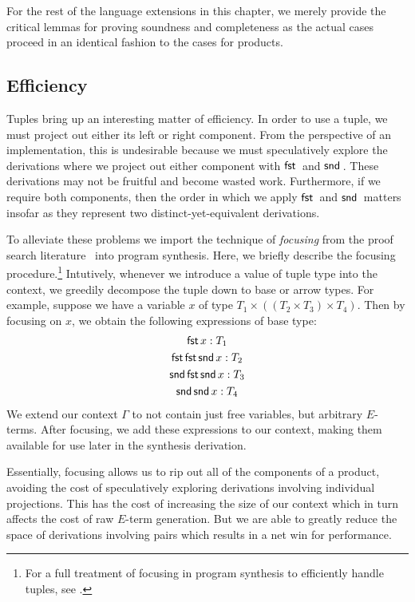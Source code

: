 For the rest of the language extensions in this chapter, we merely provide the critical lemmas for proving soundness and completeness as the actual cases proceed in an identical fashion to the cases for products.

\subsection{Efficiency}
\label{subsec:tuple-efficiency}

Tuples bring up an interesting matter of efficiency.
In order to use a tuple, we must project out either its left or right component.
From the perspective of an implementation, this is undesirable because we must speculatively explore the derivations where we project out either component with $\mfst$ and $\msnd$.
These derivations may not be fruitful and become wasted work.
Furthermore, if we require both components, then the order in which we apply $\mfst$ and $\msnd$ matters insofar as they represent two distinct-yet-equivalent derivations.

To alleviate these problems we import the technique of \emph{focusing} from the proof search literature~\citep{liang-csl-2007} into program synthesis.
Here, we briefly describe the focusing procedure.\footnote{%
  For a full treatment of focusing in program synthesis to efficiently handle tuples, see \citet{frankle-mastersthesis-2015}.
}
Intutively, whenever we introduce a value of tuple type into the context, we greedily decompose the tuple down to base or arrow types.
For example, suppose we have a variable $x$ of type $T_1 × ((T_2 × T_3) × T_4)$.
Then by focusing on $x$, we obtain the following expressions of base type:
\begin{gather*}
  \mathsf{fst}\,x : T_1 \\
  \mathsf{fst}\,\mathsf{fst}\,\mathsf{snd}\,x : T_2 \\
  \mathsf{snd}\,\mathsf{fst}\,\mathsf{snd}\,x : T_3 \\
  \mathsf{snd}\,\mathsf{snd}\,x : T_4
\end{gather*}
We extend our context $Γ$ to not contain just free variables, but arbitrary $E$-terms.
After focusing, we add these expressions to our context, making them available for use later in the synthesis derivation.

Essentially, focusing allows us to rip out all of the components of a product, avoiding the cost of speculatively exploring derivations involving individual projections.
This has the cost of increasing the size of our context which in turn affects the cost of raw $E$-term generation.
But we are able to greatly reduce the space of derivations involving pairs which results in a net win for performance.

